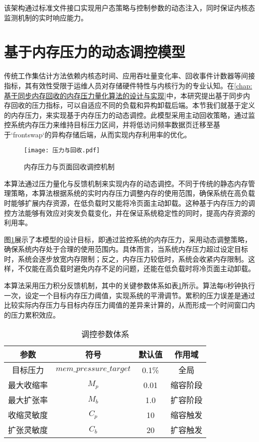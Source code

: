 该架构通过标准文件接口实现用户态策略与控制参数的动态注入，同时保证内核态监测机制的实时响应能力。



\section{基于内存压力的动态调控模型}
\label{sec:pressure_based_model}

传统工作集估计方法依赖内核态时间、应用吞吐量变化率、回收事件计数器等间接指标，其有效性受限于运维人员对存储硬件特性与内核行为的专业认知。在\ref{chap:基于同步内存回收的内存压力量化算法的设计与实现}中，本研究提出基于同步内存回收的压力指标，可以自适应不同的负载和异构卸载后端。本节我们就基于定义的内存压力，来实现基于内存压力的动态调控。此模型采用主动回收策略，通过监控系统内存压力来维持目标压力区间，并将低访问频率数据页迁移至基于`frontswap`的异构存储后端，从而实现内存利用率的优化。

\begin{figure}[h]
\centering
\texttt{[image: 压力与回收.pdf]}
\caption{内存压力与页面回收调控机制}
\label{fig:pressure_work_set}
\end{figure}

本算法通过压力量化与反馈机制来实现内存的动态调控。不同于传统的静态内存管理策略，本算法根据系统的实时内存压力调整内存的使用范围，确保系统在高负载时能够扩展内存资源，在低负载时又能将冷页面主动卸载。这种基于内存压力的调控方法能够有效应对突发负载变化，并在保证系统稳定性的同时，提高内存资源的利用率。

图\ref{fig:pressure_work_set}展示了本模型的设计目标，即通过监控系统的内存压力，采用动态调整策略，确保系统内存处于合理的使用范围内。具体而言，当系统内存压力超过设定目标时，系统会逐步放宽内存限制；反之，内存压力较低时，系统会收紧内存限制。这样，不仅能在高负载时避免内存不足的问题，还能在低负载时将冷页面主动卸载。

本算法采用压力积分反馈机制，其中的关键参数体系如表\ref{tab:params}所示。算法每6秒钟执行一次，设定一个目标内存压力阈值，实现系统的平滑调节。累积的压力误差是通过比较实际内存压力与目标内存压力阈值的差异来计算的，从而形成一个时间窗口内的压力累积效应。



\begin{table}[H]
\centering
\caption{调控参数体系}
\label{tab:params}
\begin{tabular}{cccc}
\toprule
参数 & 符号 & 默认值 & 作用域 \\
\midrule
目标压力 & \(mem\_pressure\_target\) & 0.1\% & 全局 \\
最大收缩率 & \(M_p\) & 0.01 & 缩容阶段 \\
最大扩张率 & \(M_b\) & 1.0 & 扩容阶段 \\
收缩灵敏度 & \(C_p\) & 10 & 缩容触发 \\
扩张灵敏度 & \(C_b\) & 20 & 扩容触发 \\
\bottomrule
\end{tabular}
\end{table}

